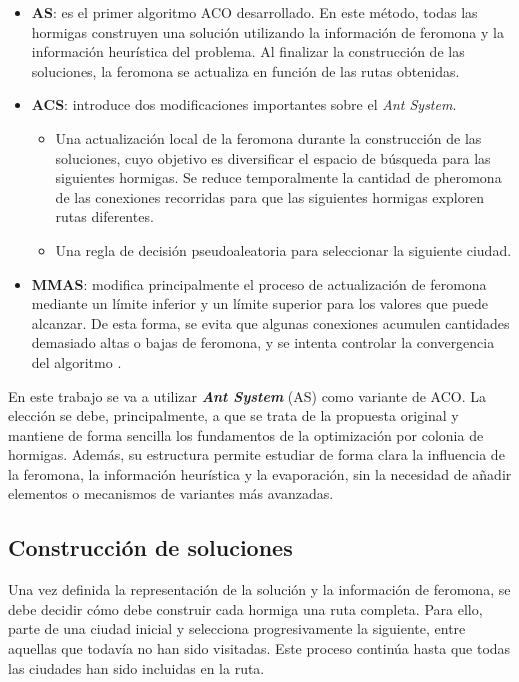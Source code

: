 \begin{itemize}
  \item \textbf{\ac{AS}}: es el primer algoritmo ACO desarrollado. En este método, todas las hormigas construyen una solución
  utilizando la información de feromona y la información heurística del problema. Al finalizar la construcción de las 
  soluciones, la feromona se actualiza en función de las rutas obtenidas.
  \item \textbf{\ac{ACS}}: introduce dos modificaciones importantes sobre el \textit{Ant  System}. 
  \begin{itemize}
    \item Una actualización local de la feromona durante la construcción de las soluciones, cuyo objetivo es diversificar el
    espacio de búsqueda para las siguientes hormigas. Se reduce temporalmente la cantidad de pheromona de las conexiones 
    recorridas para que las siguientes hormigas exploren rutas diferentes.
    \item Una regla de decisión pseudoaleatoria para seleccionar la siguiente ciudad.
  \end{itemize}
  \item \textbf{\ac{MMAS}}: modifica principalmente el proceso de actualización de feromona mediante un límite inferior y un
  límite superior para los valores que puede alcanzar. De esta forma, se evita que algunas conexiones acumulen cantidades
  demasiado altas o bajas de feromona, y se intenta controlar la convergencia del algoritmo \cite{dorigo2006}. 
\end{itemize}

En este trabajo se va a utilizar \textbf{\textit{Ant System}} (AS) como variante de ACO. La elección se debe, principalmente,
a que se trata de la propuesta original y mantiene de forma sencilla los fundamentos de la optimización por colonia de 
hormigas. Además, su estructura permite estudiar de forma clara la influencia de la feromona, la información heurística y 
la evaporación, sin la necesidad de añadir elementos o mecanismos de variantes más avanzadas.

\subsection{Construcción de soluciones}
\label{subsec:aco_sol_const}

Una vez definida la representación de la solución y la información de feromona, se debe decidir cómo debe construir 
cada hormiga una ruta completa. Para ello, parte de una ciudad inicial y selecciona progresivamente la siguiente, entre 
aquellas que todavía no han sido visitadas. Este proceso continúa hasta que todas las ciudades han sido incluidas en la 
ruta.

